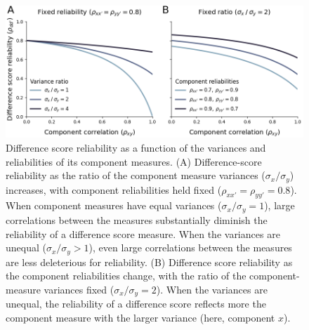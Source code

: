\documentclass[a4paper,12pt]{article}
\begin{document}
\begin{figure}[t]
    \centering
    \includegraphics[width=1\textwidth]{figures/fig02.png}
    \caption{\small Difference score reliability as a function of the variances and reliabilities of its component measures. (A) Difference-score reliability as the ratio of the component measure variances ($\sigma_x / \sigma_y$) increases, with component reliabilities held fixed ($\rho_{xx'} = \rho_{yy'} = 0.8$). When component measures have equal variances ($\sigma_x / \sigma_y = 1$), large correlations between the measures substantially diminish the reliability of a difference score measure. When the variances are unequal ($\sigma_x / \sigma_y > 1$), even large correlations between the measures are less deleterious for reliability. (B) Difference score reliability as the component reliabilities change, with the ratio of the component-measure variances fixed ($\sigma_x / \sigma_y = 2$). When the variances are unequal, the reliability of a difference score reflects more the component measure with the larger variance (here, component $x$).}
    \label{fig:fig03}
\end{figure}
\end{document}
